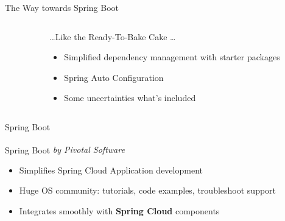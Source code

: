 \begin{frame}[t]{The Way towards Spring Boot}
{\begin{columns}[T]
\begin{column}{.42\textwidth}
\end{column}
\begin{column}{.55\textwidth}
\ldots Like the Ready-To-Bake Cake \ldots
	\begin{itemize}
		\item Simplified dependency management with starter packages
		\item Spring Auto Configuration %
		\item Some uncertainties what's included
	\end{itemize}
\end{column}
\end{columns}
}
\end{frame}

\begin{frame}[t]{Spring Boot}
\begin{block}{Spring Boot \textit{by Pivotal Software \textsuperscript{\textcopyright}}}
	\begin{itemize}
	\item Simplifies Spring Cloud Application development
	\item Huge OS community: tutorials, code examples, troubleshoot support
	\item Integrates smoothly with \textbf{Spring Cloud} components
	\end{itemize}
\end{block}
\vfill
{}	
\end{frame}


